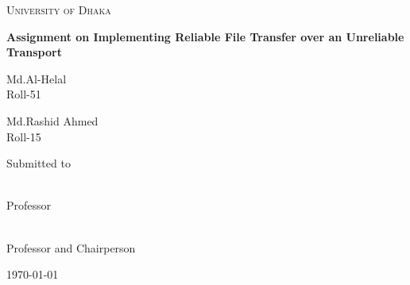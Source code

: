 \documentclass[12pt,a4paper]{report}
\begin{document}
\begin{titlepage}
\centering
{\scshape\LARGE University of Dhaka \par}
\vspace{1.5cm}
{\huge\bfseries Assignment on Implementing Reliable File Transfer over an Unreliable Transport\par}
\vspace{3cm}
{\Large \parbox{5cm}{\centering Md.Al-Helal\\Roll-51}\hspace{4cm}\parbox{6cm}{\centering Md.Rashid Ahmed\\Roll-15}}
\vfill
Submitted to\\
\vspace{0.8cm}
\parbox{9cm}{ \\ Professor}\hspace{1cm}\parbox{5cm}{ \\Professor and Chairperson}
\vfill
{\large \today\par}
\end{titlepage}
\end{document}
